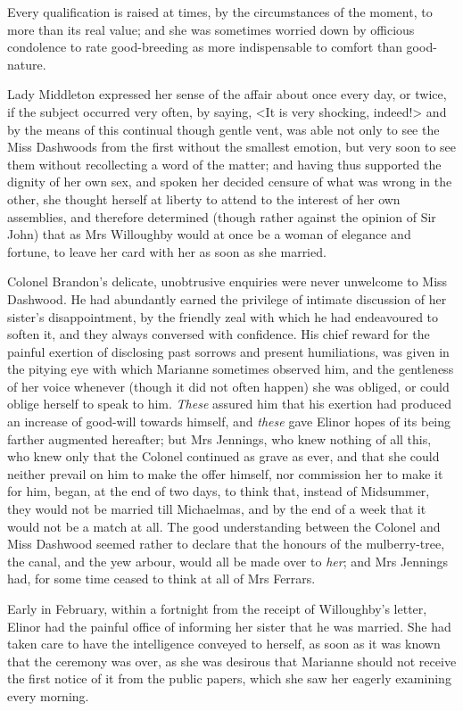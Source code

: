 Every qualification is raised at times, by the circumstances of the moment, to more than its real value; and she was sometimes worried down by officious condolence to rate good-breeding as more indispensable to comfort than good-nature.

Lady Middleton expressed her sense of the affair about once every day, or twice, if the subject occurred very often, by saying, <It is very shocking, indeed!> and by the means of this continual though gentle vent, was able not only to see the Miss Dashwoods from the first without the smallest emotion, but very soon to see them without recollecting a word of the matter; and having thus supported the dignity of her own sex, and spoken her decided censure of what was wrong in the other, she thought herself at liberty to attend to the interest of her own assemblies, and therefore determined (though rather against the opinion of Sir John) that as Mrs Willoughby would at once be a woman of elegance and fortune, to leave her card with her as soon as she married.

Colonel Brandon's delicate, unobtrusive enquiries were never unwelcome to Miss Dashwood. He had abundantly earned the privilege of intimate discussion of her sister's disappointment, by the friendly zeal with which he had endeavoured to soften it, and they always conversed with confidence. His chief reward for the painful exertion of disclosing past sorrows and present humiliations, was given in the pitying eye with which Marianne sometimes observed him, and the gentleness of her voice whenever (though it did not often happen) she was obliged, or could oblige herself to speak to him. \textit{These} assured him that his exertion had produced an increase of good-will towards himself, and \textit{these} gave Elinor hopes of its being farther augmented hereafter; but Mrs Jennings, who knew nothing of all this, who knew only that the Colonel continued as grave as ever, and that she could neither prevail on him to make the offer himself, nor commission her to make it for him, began, at the end of two days, to think that, instead of Midsummer, they would not be married till Michaelmas, and by the end of a week that it would not be a match at all. The good understanding between the Colonel and Miss Dashwood seemed rather to declare that the honours of the mulberry-tree, the canal, and the yew arbour, would all be made over to \textit{her}; and Mrs Jennings had, for some time ceased to think at all of Mrs Ferrars.

Early in February, within a fortnight from the receipt of Willoughby's letter, Elinor had the painful office of informing her sister that he was married. She had taken care to have the intelligence conveyed to herself, as soon as it was known that the ceremony was over, as she was desirous that Marianne should not receive the first notice of it from the public papers, which she saw her eagerly examining every morning.

